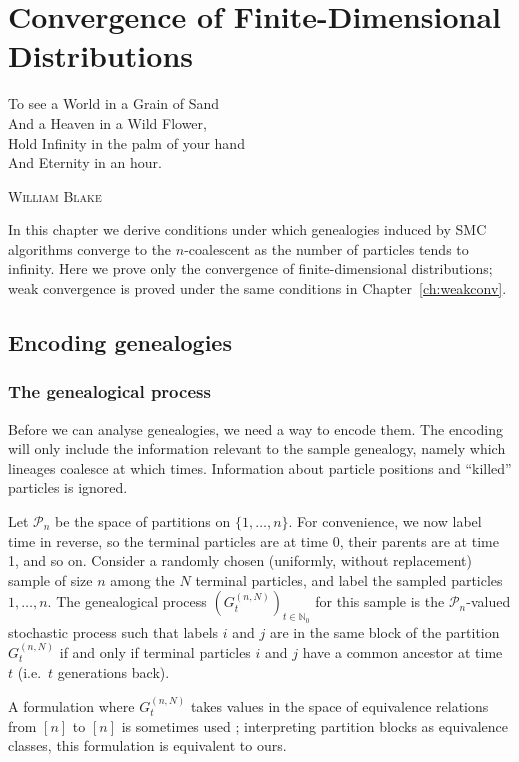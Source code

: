 \chapter{Convergence of Finite-Dimensional Distributions} %
\label{ch:limits}

\epigraph{
To see a World in a Grain of Sand\\
And a Heaven in a Wild Flower,\\
Hold Infinity in the palm of your hand\\
And Eternity in an hour.
}
{\textsc{William Blake}} 

In this chapter we derive conditions under which genealogies induced by SMC algorithms converge to the $n$-coalescent as the number of particles tends to infinity. Here we prove only the convergence of finite-dimensional distributions; weak convergence is proved under the same conditions in Chapter~\ref{ch:weakconv}.

\section{Encoding genealogies}

\subsection{The genealogical process}
Before we can analyse genealogies, we need a way to encode them.
The encoding will only include the information relevant to the sample genealogy, namely which lineages coalesce at which times. Information about particle positions and ``killed'' particles is ignored.

Let $\mathcal{P}_n$ be the space of partitions on $\{1,\dots,n\}$.
For convenience, we now label time in reverse, so the terminal particles are at time 0, their parents are at time 1, and so on.
Consider a randomly chosen (uniformly, without replacement) sample of size $n$ among the $N$ terminal particles, and label the sampled particles $1,\dots,n$.
The genealogical process $(G_t^{(n,N)})_{t\in\mathbb{N}_0}$ for this sample is the $\mathcal{P}_n$-valued stochastic process such that labels $i$ and $j$ are in the same block of the partition $G_t^{(n,N)}$ if and only if terminal particles $i$ and $j$ have a common ancestor at time $t$ (i.e.\ $t$ generations back).

A formulation where $G_t^{(n,N)}$ takes values in the space of equivalence relations from $[n]$ to $[n]$ is sometimes used \parencite[e.g.][]{mohle1999}; interpreting partition blocks as equivalence classes, this formulation is equivalent to ours.

